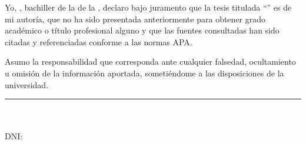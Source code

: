 Yo, \AutorPrincipal{}, bachiller de la \Escuela{} de la \Universidad{}, declaro bajo juramento que la tesis titulada ``\TituloTesis'' es de mi autoría, que no ha sido presentada anteriormente para obtener grado académico o título profesional alguno y que las fuentes consultadas han sido citadas y referenciadas conforme a las normas APA.

Asumo la responsabilidad que corresponda ante cualquier falsedad, ocultamiento u omisión de la información aportada, sometiéndome a las disposiciones de la universidad.

\vspace{2.5cm}
\begin{center}
\rule{7cm}{0.4pt}\\
\AutorPrincipal\\
DNI: \AutorPrincipalDNI
\end{center}
